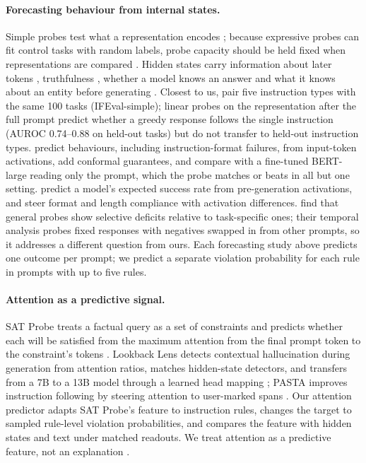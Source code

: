 \documentclass{article}
\begin{document}
\paragraph{Forecasting behaviour from internal states.} Simple probes test what a representation encodes
\citep{alain2016probes,belinkov2022probing}; because expressive probes can fit control tasks with random labels, probe
capacity should be held fixed when representations are compared \citep{hewitt2019control}. Hidden states carry
information about later tokens \citep{pal2023future}, truthfulness \citep{azaria2023internal,burns2023discovering,marks2023geometry},
whether a model knows an answer \citep{kadavath2022know} and what it knows about an entity before generating
\citep{gottesman2024estimating}.
Closest to us, \citet{heo2025know} pair five instruction types with the same 100 tasks (IFEval-simple); linear probes
on the representation after the full prompt predict whether a greedy response follows the single instruction (AUROC
0.74--0.88 on held-out tasks) but do not transfer to held-out instruction types. \citet{ashok2025predict} predict
behaviours, including instruction-format failures, from input-token activations, add conformal guarantees, and
compare with a fine-tuned BERT-large reading only the prompt, which the probe matches or beats in all but one setting.
\citet{lugoloobi2026encode} predict a model's expected success rate from pre-generation activations, and
\citet{stolfo2025steering} steer format and length compliance with activation differences.
\citet{rocchetti2026follow} find that general probes show selective deficits relative to task-specific ones; their
temporal analysis probes fixed responses with negatives swapped in from other prompts, so it addresses a different
question from ours. Each forecasting study above predicts one outcome per prompt; we predict a separate violation
probability for each rule in prompts with up to five rules.

\paragraph{Attention as a predictive signal.} SAT Probe treats a factual query as a set of constraints and predicts
whether each will be satisfied from the maximum attention from the final prompt token to the constraint's tokens
\citep{yuksekgonul2024attention}. Lookback Lens detects contextual hallucination during generation from attention
ratios, matches hidden-state detectors, and transfers from a 7B to a 13B model through a learned head mapping
\citep{chuang2024lookback}; PASTA improves instruction following by steering attention to user-marked spans
\citep{zhang2024pasta}. Our attention predictor adapts SAT Probe's feature to instruction rules, changes the target to
sampled rule-level violation probabilities, and compares the feature with hidden states and text under matched
readouts. We treat attention as a predictive feature, not an explanation \citep{jain2019attention,wiegreffe2019attention}.
\end{document}
